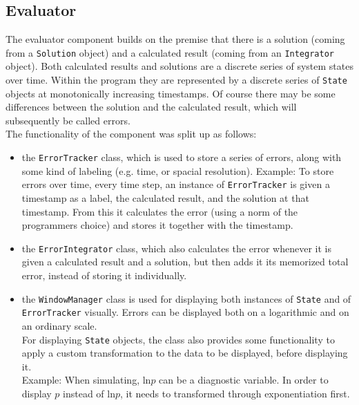 \subsection*{Evaluator}
The evaluator component builds on the premise that there is a solution (coming from a \texttt{Solution} object) and a calculated result (coming from an \texttt{Integrator} object).
Both calculated results and solutions are a discrete series of system states over time.
Within the program they are represented by a discrete series of \texttt{State} objects at monotonically increasing timestamps.
Of course there may be some differences between the solution and the calculated result, which will subsequently be called errors.
\\
The functionality of the component was split up as follows:
\begin{itemize}
\item the \texttt{ErrorTracker} class, which is used to store a series of errors, along with some kind of labeling (e.g. time, or spacial resolution).
Example: To store errors over time, every time step, an instance of \texttt{ErrorTracker} is given a timestamp as a label, the calculated result, and the solution at that timestamp.
From this it calculates the error (using a norm of the programmers choice) and stores it together with the timestamp.
\item the \texttt{ErrorIntegrator} class, which also calculates the error whenever it is given a calculated result and a solution, but then adds it its memorized total error, instead of storing it individually.
\item the \texttt{WindowManager} class is used for displaying both instances of \texttt{State} and of \texttt{ErrorTracker} visually.
Errors can be displayed both on a logarithmic and on an ordinary scale.
\\
For displaying \texttt{State} objects, the class also provides some functionality to apply a custom transformation to the data to be displayed, before displaying it.
\\
Example: When simulating, $\text{ln}p$ can be a diagnostic variable. In order to display $p$ instead of $\text{ln}p$, it needs to transformed through exponentiation first.
\end{itemize}

